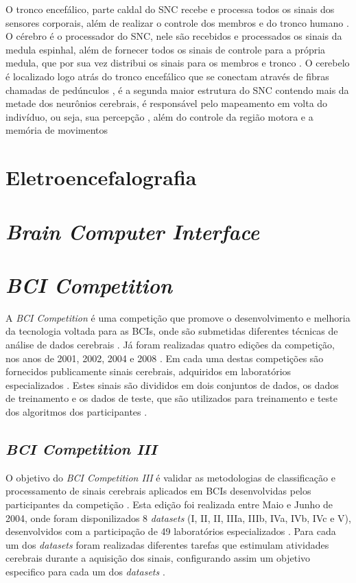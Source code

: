 O tronco encefálico, parte caldal do SNC recebe e processa todos os sinais dos sensores corporais, além de realizar o controle dos membros e do tronco humano \cite{KANDEL}.
O cérebro é o processador do SNC, nele são recebidos e processados os sinais da medula espinhal, além de fornecer todos os sinais de controle para a própria medula, que por sua vez distribui os sinais para os membros e tronco \cite{KANDEL}.
O cerebelo é localizado logo atrás do tronco encefálico que se conectam através de fibras chamadas de pedúnculos \cite{KANDEL}, é a segunda maior estrutura do SNC contendo mais da metade dos neurônios cerebrais, \cite{SIULYDissertacao} é responsável pelo mapeamento em volta do indivíduo, ou seja, sua percepção \cite{alvarezneurobiomecanismos}, além do controle da região motora e a memória de movimentos \cite{SIULYDissertacao,alvarezneurobiomecanismos}

\section{Eletroencefalografia}

\section{\textit{Brain Computer Interface}}

\section{\textit{BCI Competition}}
A \textit{BCI Competition} é uma competição que promove o desenvolvimento e melhoria da tecnologia voltada para as BCIs, onde são submetidas diferentes técnicas de análise de dados cerebrais \cite{BCICompetition}. Já foram realizadas quatro edições da competição, nos anos de 2001, 2002, 2004 e 2008 \cite{BCICompetition}. Em cada uma destas competições são fornecidos publicamente sinais cerebrais, adquiridos em laboratórios especializados \cite{BCICompetition}. Estes sinais são divididos em dois conjuntos de dados, os dados de treinamento e os dados de teste, que são utilizados para treinamento e teste dos algoritmos dos participantes \cite{BCICompetition}.

\subsection{\textit{BCI Competition III}}
O objetivo do \textit{BCI Competition III} é validar as metodologias de classificação e processamento de sinais cerebrais aplicados em BCIs desenvolvidas pelos participantes da competição \cite{siteBCI}. Esta edição foi realizada entre Maio e Junho de 2004, onde foram disponilizados 8 \textit{datasets} (I, II, II, IIIa, IIIb, IVa, IVb, IVc e V), desenvolvidos com a participação de 49 laboratórios especializados \cite{BCICompetition}.
Para cada um dos \textit{datasets} foram realizadas diferentes tarefas que estimulam atividades cerebrais durante a aquisição dos sinais, configurando assim um objetivo especifico para cada um dos \textit{datasets} \cite{siteBCI}.


